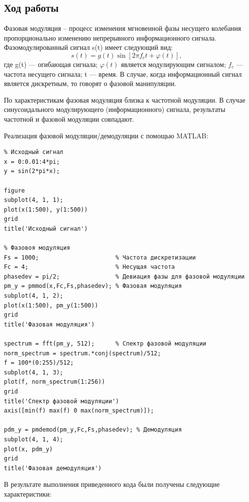 \documentclass[10pt,a4paper]{article}
\begin{document}
\subsection{Ход работы}
Фазовая модуляция – процесс изменения мгновенной фазы несущего колебания пропорционально изменению непрерывного информационного сигнала. Фазомодулированный сигнал s(t) имеет следующий вид:
	\begin{equation}
	s(t) = g(t) \sin[2 \pi f_c t + \varphi(t)],
	\end{equation}
где g(t) — огибающая сигнала; $\varphi(t)$ является модулирующим сигналом; $f_c$ — частота несущего сигнала; t — время.
В случае, когда информационный сигнал является дискретным, то говорят о фазовой манипуляции.

По характеристикам фазовая модуляция близка к частотной модуляции. В случае синусоидального модулирующего (информационного) сигнала, результаты частотной и фазовой модуляции совпадают.

Реализация фазовой модуляции/демодуляции с помощью MATLAB:
\begin{verbatim}
% Исходный сигнал
x = 0:0.01:4*pi;
y = sin(2*pi*x);

figure
subplot(4, 1, 1);
plot(x(1:500), y(1:500))
grid
title('Исходный сигнал')
 
% Фазовоя модуляция
Fs = 1000;                      % Частота дискретизации 
Fc = 4;                         % Несущая частота 
phasedev = pi/2;                % Девиация фазы для фазовой модуляции
pm_y = pmmod(x,Fc,Fs,phasedev); % Фазовая модуляция
subplot(4, 1, 2);
plot(x(1:500), pm_y(1:500))
grid
title('Фазовая модуляция')

spectrum = fft(pm_y, 512);      % Спектр фазовой модуляции
norm_spectrum = spectrum.*conj(spectrum)/512;  
f = 100*(0:255)/512;
subplot(4, 1, 3);
plot(f, norm_spectrum(1:256))
grid
title('Спектр фазовой модуляции')
axis([min(f) max(f) 0 max(norm_spectrum)]);

pdm_y = pmdemod(pm_y,Fc,Fs,phasedev); % Демодуляция
subplot(4, 1, 4);
plot(x, pdm_y)
grid
title('Фазовая демодуляция')
\end{verbatim}


В результате выполнения приведенного кода были получены следующие характеристики:
\end{document}
